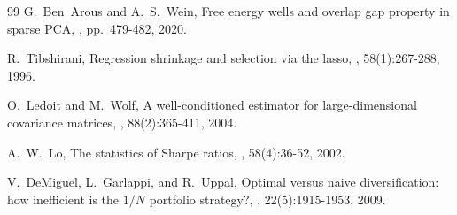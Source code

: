 \documentclass[11pt]{article}
\begin{document}
\begin{thebibliography}{99}
G.~Ben~Arous and A.~S.~Wein,
\newblock Free energy wells and overlap gap property in sparse PCA,
, pp.~479-482, 2020.

R.~Tibshirani,
\newblock Regression shrinkage and selection via the lasso,
, 58(1):267-288, 1996.

O.~Ledoit and M.~Wolf,
\newblock A well-conditioned estimator for large-dimensional covariance matrices,
, 88(2):365-411, 2004.

A.~W.~Lo,
\newblock The statistics of Sharpe ratios,
, 58(4):36-52, 2002.

V.~DeMiguel, L.~Garlappi, and R.~Uppal,
\newblock Optimal versus naive diversification: how inefficient is the $1/N$ portfolio strategy?,
, 22(5):1915-1953, 2009.

\end{thebibliography}
\end{document}

